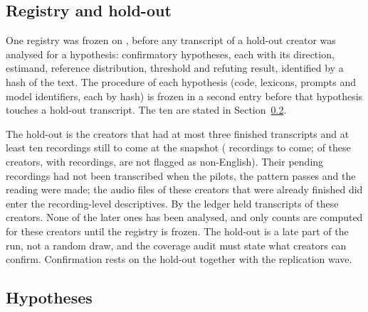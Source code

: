 \documentclass[letterpaper]{article} %
\begin{document}
\subsection{Registry and hold-out}

One registry was frozen on \RegistryFrozenDate, before any transcript of a hold-out creator was analysed for a hypothesis: \NMaxConfirmatory{} confirmatory hypotheses, each with its direction, estimand, reference distribution, threshold and refuting result, identified by a hash of the text. The procedure of each hypothesis (code, lexicons, prompts and model identifiers, each by hash) is frozen in a second entry before that hypothesis touches a hold-out transcript. The ten are stated in Section~\ref{sec:hypotheses}.

The hold-out is the \NHoldout{} creators that had at most three finished transcripts and at least ten recordings still to come at the snapshot (\HoldoutOutstanding{} recordings to come; \NHoldoutNotNonEnglish{} of these creators, with \HoldoutNotNonEnglishOutstanding{} recordings, are not flagged as non-English). Their pending recordings had not been transcribed when the pilots, the pattern passes and the reading were made; the \HoldoutInSnapshot{} audio files of these creators that were already finished did enter the recording-level descriptives. By \NowStamp{} the ledger held \HoldoutNowLines{} transcripts of these creators. None of the later ones has been analysed, and only counts are computed for these creators until the registry is frozen. The hold-out is a late part of the run, not a random draw, and the coverage audit must state what \NHoldoutNotNonEnglish{} creators can confirm. Confirmation rests on the hold-out together with the replication wave.

\subsection{Hypotheses}
\label{sec:hypotheses}
\end{document}
